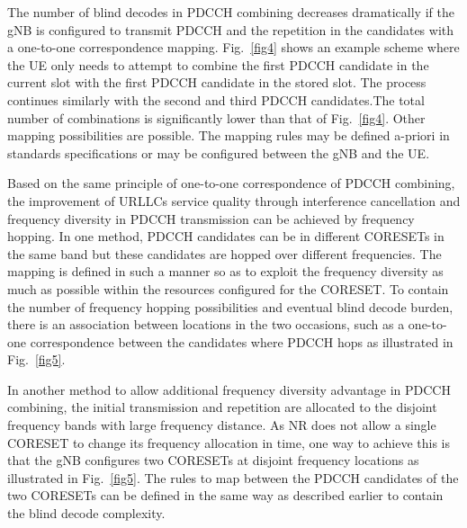 \documentclass[conference]{IEEEtran}
\begin{document}
The number of blind decodes in PDCCH combining decreases dramatically if the gNB is configured to transmit PDCCH and the repetition in the candidates with a one-to-one correspondence mapping. Fig.~\ref{fig4} shows an example scheme where the UE only needs to attempt to combine the first PDCCH candidate in the current slot with the first PDCCH candidate in the stored slot. The process continues similarly with the second and third PDCCH candidates.The total number of combinations is significantly lower than that of Fig.~\ref{fig4}. Other mapping possibilities are possible. The mapping rules may be defined a-priori in standards specifications or may be configured between the gNB and the UE. 

Based on the same principle of one-to-one correspondence of PDCCH
combining, the improvement of URLLC\textquotesingle s service quality through interference cancellation and frequency diversity in PDCCH transmission can be achieved by frequency hopping. In one
method, PDCCH candidates can be in different CORESETs in the same band but these candidates are hopped over different frequencies. The mapping is defined in such a manner so as to exploit the frequency diversity as much as possible within the resources configured for the CORESET. To contain the number of frequency hopping possibilities and eventual blind decode burden, there is an association between locations in the two occasions, such as a one-to-one correspondence between the candidates where PDCCH hops as illustrated in Fig.~\ref{fig5}.

In another method to allow additional frequency diversity advantage in PDCCH combining, the initial transmission and repetition are allocated to the disjoint frequency bands with large frequency distance. As NR does not allow a single CORESET to change its frequency allocation in time, one way to achieve this is that the gNB configures two CORESETs at disjoint frequency locations as illustrated in Fig.~\ref{fig5}. The rules to map between the PDCCH candidates of the two CORESETs can be defined in the same way as described earlier to contain the blind decode complexity. 
\end{document}
